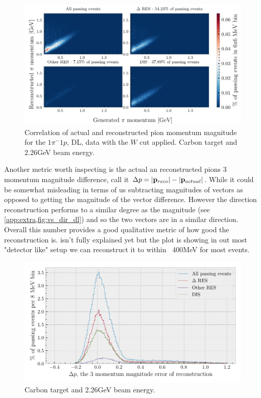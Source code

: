 \documentclass[a4paper,12pt]{article}
\newcommand{\md}{$1\pi^-1p$}
\begin{document}
\begin{figure}[H]
    \centering
    \includegraphics{figures/python/vs_pp_C_m_dl_W.pdf}
    \caption{
        Correlation of actual and reconstructed pion momentum magnitude for the \md, DL, data with the $W$ cut applied.
        Carbon target and 2.26\si{GeV} beam energy.
    }\label{fig:vs_pp_dl_W}
\end{figure}


Another metric worth inspecting is the actual an reconstructed pions 3 momentum magnitude difference, call it $\Delta p = |\vb{p}_{reco}| - |\vb{p}_{actual}|$.
While it could be somewhat misleading in terms of us subtracting magnitudes of vectors as opposed to getting the magnitude of the vector difference.
However the direction reconstruction performs to a similar degree as the magnitude (see \cref{app:extra,fig:vs_dir_dl}) and so the two vectors are in a similar direction.
Overall this number provides a good qualitative metric of how good the reconstruction is.
isn't fully explained yet but the plot is showing in out most "detector like" setup we can reconstruct it to within ~400MeV for most events.

\begin{figure}[H]
    \centering
    \includegraphics{figures/python/metr_m_dl_W.pdf}
    \caption{
        Carbon target and 2.26\si{GeV} beam energy.
    }\label{fig:p_test_dl_W}
\end{figure}
\end{document}

